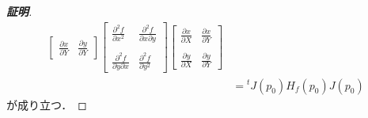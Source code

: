 \documentclass[11pt, a4paper, dvipdfmx]{jsarticle}
\theoremstyle{definition}
\newcommand{\p}{\partial}
\newcommand{\dip}{\displaystyle} %
\theoremstyle{mystyle}
\numberwithin{equation}{section} %
\begin{document}
\begin{proof}[\textbf{証明}]
\begin{align*}
\begin{bmatrix*}
            \dip \frac{\p x}{\p Y} &\dip \frac{\p y}{\p Y}
        \end{bmatrix*}\begin{bmatrix*}
            \dip \frac{\p^2 f}{\p x^2} &\dip \frac{\p^2 f}{\p x\p y}\\\\
            \dip \frac{\p^2 f}{\p y\p x} &\dip \frac{\p^2 f}{\p y^2}
        \end{bmatrix*}\begin{bmatrix*}
            \dip \frac{\p x}{\p X} &\dip \frac{\p x}{\p Y}\\\\
            \dip \frac{\p y}{\p X} &\dip \frac{\p y}{\p Y}
        \end{bmatrix*}\\
        &={}^t\!J(p_0)H_f(p_0)J(p_0)
    \end{align*}
    が成り立つ．
\end{proof}
\end{document}
